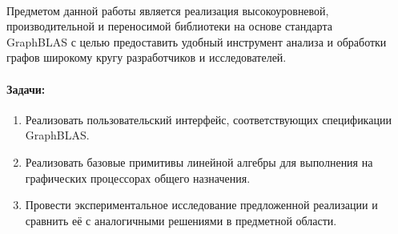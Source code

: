 \label{sec:task}
\paragraph{}
Предметом данной работы является реализация высокоуровневой, производительной и переносимой библиотеки на основе стандарта \\ GraphBLAS с целью предоставить удобный инструмент анализа и обработки графов широкому кругу разработчиков и исследователей.
\paragraph{Задачи:}
\begin{enumerate}
    \item Реализовать пользовательский интерфейс,
соответствующих спецификации GraphBLAS.
    \item Реализовать базовые примитивы линейной алгебры для выполнения на графических процессорах общего назначения.
    \item Провести экспериментальное исследование предложенной
реализации и сравнить её с аналогичными решениями в
предметной области.
\end{enumerate}
